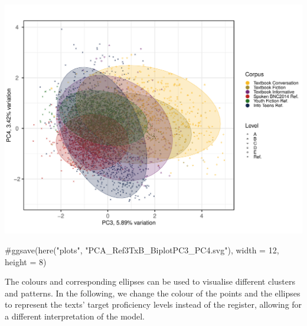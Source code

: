 \documentclass[
  letterpaper,
  DIV=11,
  numbers=noendperiod]{scrreprt}
\newenvironment{Shaded}{\begin{snugshade}}{\end{snugshade}}
\newcommand{\CommentTok}[1]{\textcolor[rgb]{0.37,0.37,0.37}{#1}}
\begin{document}
\includegraphics{AppendixH_files/figure-pdf/PCAtools-biplots-TxB-2.pdf}

\begin{Shaded}
\begin{Highlighting}[]
\CommentTok{\#ggsave(here("plots", "PCA\_Ref3TxB\_BiplotPC3\_PC4.svg"), width = 12, height = 8)}
\end{Highlighting}
\end{Shaded}

The colours and corresponding ellipses can be used to visualise
different clusters and patterns. In the following, we change the colour
of the points and the ellipses to represent the texts' target
proficiency levels instead of the register, allowing for a different
interpretation of the model.
\end{document}
